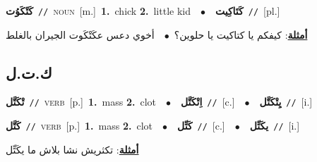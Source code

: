 \documentclass[10pt,a4paper,twoside]{article} %
\begin{document}
\begin{multicols}{2}
{\setlength\topsep{0pt}\textbf{\foreignlanguage{arabic}{كَتْكَوُت}}\ {\color{gray}\texttt{//}\color{black}}\ \textsc{noun}\ [m.]\ \textbf{1.}~chick  \textbf{2.}~little kid\ \ $\bullet$\ \ \setlength\topsep{0pt}\textbf{\foreignlanguage{arabic}{كَتَاكِيت}}\ {\color{gray}\texttt{//}\color{black}}\ [pl.]\  \begin{flushright}\color{gray}\foreignlanguage{arabic}{\textbf{\underline{\foreignlanguage{arabic}{أمثلة}}}: كيفكم يا كتاكيت يا حلوين؟\ $\bullet$\ \  أخوي دعس عكَتْكَوت الجيران بالغلط}\end{flushright}\color{black}} \vspace{2mm}

\vspace{-3mm}
\subsection*{\color{blue}\foreignlanguage{arabic}{ك.ت.ل}\color{blue}{}} 

{\setlength\topsep{0pt}\textbf{\foreignlanguage{arabic}{تْكَتَّل}}\ {\color{gray}\texttt{//}\color{black}}\ \textsc{verb}\ [p.]\ \textbf{1.}~mass  \textbf{2.}~clot\ \ $\bullet$\ \ \setlength\topsep{0pt}\textbf{\foreignlanguage{arabic}{اِتْكَتَّل}}\ {\color{gray}\texttt{//}\color{black}}\ [c.]\ \ $\bullet$\ \ \setlength\topsep{0pt}\textbf{\foreignlanguage{arabic}{يِتْكَتَّل}}\ {\color{gray}\texttt{//}\color{black}}\ [i.]\ } \vspace{2mm}

{\setlength\topsep{0pt}\textbf{\foreignlanguage{arabic}{كَتَّل}}\ {\color{gray}\texttt{//}\color{black}}\ \textsc{verb}\ [p.]\ \textbf{1.}~mass  \textbf{2.}~clot\ \ $\bullet$\ \ \setlength\topsep{0pt}\textbf{\foreignlanguage{arabic}{كَتِّل}}\ {\color{gray}\texttt{//}\color{black}}\ [c.]\ \ $\bullet$\ \ \setlength\topsep{0pt}\textbf{\foreignlanguage{arabic}{يكَتِّل}}\ {\color{gray}\texttt{//}\color{black}}\ [i.]\  \begin{flushright}\color{gray}\foreignlanguage{arabic}{\textbf{\underline{\foreignlanguage{arabic}{أمثلة}}}: تكثريش نشا بلاش ما يكَتِّل}\end{flushright}\color{black}} \vspace{2mm}


\end{multicols}
\end{document}
